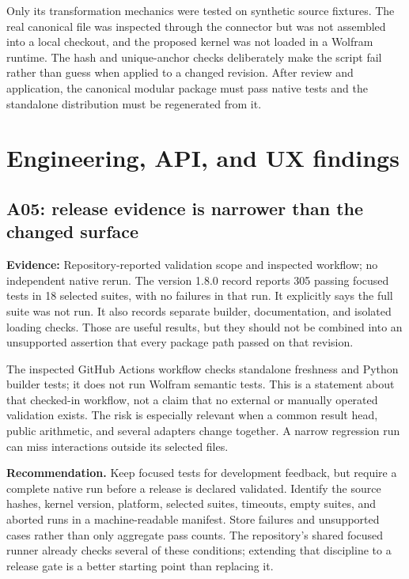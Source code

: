 \documentclass[11pt,a4paper]{article}
\newcommand{\status}[1]{\textbf{Evidence:} #1.}
\theoremstyle{remark}\newtheorem{remark}[proposition]{Remark}
\begin{document}
Only its transformation mechanics were tested on synthetic source fixtures. The real canonical file was inspected through the connector but was not assembled into a local checkout, and the proposed kernel was not loaded in a Wolfram runtime. The hash and unique-anchor checks deliberately make the script fail rather than guess when applied to a changed revision. After review and application, the canonical modular package must pass native tests and the standalone distribution must be regenerated from it.



\section{Engineering, API, and UX findings}
\subsection{A05: release evidence is narrower than the changed surface}
\status{Repository-reported validation scope and inspected workflow; no independent native rerun}
The version 1.8.0 record reports 305 passing focused tests in 18 selected suites, with no failures in that run. It explicitly says the full suite was not run. It also records separate builder, documentation, and isolated loading checks. Those are useful results, but they should not be combined into an unsupported assertion that every package path passed on that revision.\cite{validation}

The inspected GitHub Actions workflow checks standalone freshness and Python builder tests; it does not run Wolfram semantic tests. This is a statement about that checked-in workflow, not a claim that no external or manually operated validation exists. The risk is especially relevant when a common result head, public arithmetic, and several adapters change together. A narrow regression run can miss interactions outside its selected files.\cite{workflow}

\textbf{Recommendation.} Keep focused tests for development feedback, but require a complete native run before a release is declared validated. Identify the source hashes, kernel version, platform, selected suites, timeouts, empty suites, and aborted runs in a machine-readable manifest. Store failures and unsupported cases rather than only aggregate pass counts. The repository's shared focused runner already checks several of these conditions; extending that discipline to a release gate is a better starting point than replacing it.\cite{runner}
\end{document}
